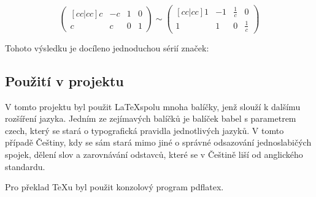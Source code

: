 \documentclass[main.tex]{subfiles}
\begin{document}
$$
\begin{pmatrix}[cc|cc]
	c & -c & 1 & 0 \\
	c & c & 0 & 1 
\end{pmatrix}
\sim
\begin{pmatrix}[cc|cc]
	1 & -1 & \frac{1}{c} & 0 \\
	1 & 1 & 0 & \frac{1}{c} 
\end{pmatrix}
$$

Tohoto výsledku je docíleno jednoduchou sérií značek: %

\subsection{Použití v projektu}
V tomto projektu byl použit \LaTeX spolu mnoha balíčky, jenž slouží k dalšímu rozšíření jazyka. Jedním ze zejímavých balíčků je balíček babel s parametrem czech, který se stará o typografická pravidla jednotlivých jazyků. V tomto případě Češtiny, kdy se sám stará mimo jiné o správné odsazování jednoslabičých spojek, dělení slov a zarovnávání odstavců, které se v Češtině liší od anglického standardu. 

Pro překlad TeXu byl použit konzolový program pdflatex.
\end{document}
